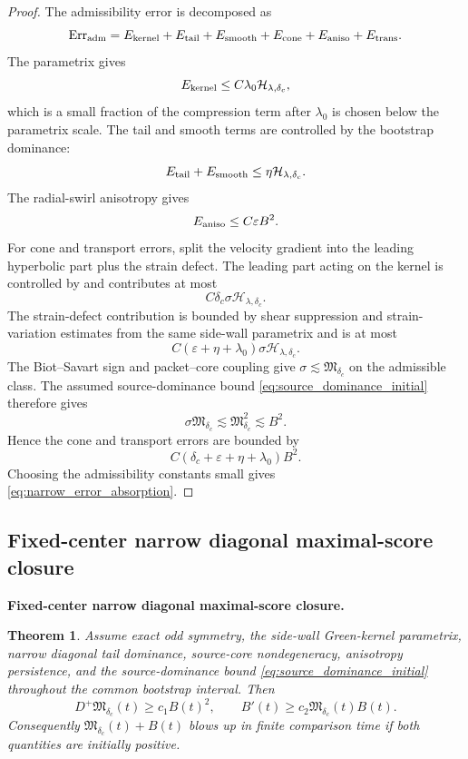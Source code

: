\documentclass[11pt]{amsart}
\newtheorem{theorem}{Theorem}[section]
\begin{document}
\begin{proof}
The admissibility error is decomposed as
\[
\operatorname{Err}_{\rm adm}=E_{\rm kernel}+E_{\rm tail}+E_{\rm smooth}+E_{\rm cone}+E_{\rm aniso}+E_{\rm trans}.
\]
The parametrix gives
\[
E_{\rm kernel}\le C\lambda_0\mathcal H_{\lambda,\delta_c},
\]
which is a small fraction of the compression term after \(\lambda_0\) is chosen below the parametrix scale.  The tail and smooth terms are controlled by the bootstrap dominance:
\[
E_{\rm tail}+E_{\rm smooth}\le\eta\mathcal H_{\lambda,\delta_c}.
\]
The radial-swirl anisotropy gives
\[
E_{\rm aniso}\le C\varepsilon B^2.
\]
For cone and transport errors, split the velocity gradient into the leading hyperbolic part plus the strain defect.  The leading part acting on the kernel is controlled by  and contributes at most
\[
C\delta_c\sigma\mathcal H_{\lambda,\delta_c}.
\]
The strain-defect contribution is bounded by shear suppression and strain-variation estimates from the same side-wall parametrix and is at most
\[
C(\varepsilon+\eta+\lambda_0)\sigma\mathcal H_{\lambda,\delta_c}.
\]
The Biot--Savart sign and packet--core coupling give
\(\sigma\lesssim \mathfrak M_{\delta_c}\) on the admissible class.  The assumed
source-dominance bound \eqref{eq:source_dominance_initial} therefore gives
\[
\sigma\mathfrak M_{\delta_c}\lesssim \mathfrak M_{\delta_c}^2\lesssim B^2.
\]
Hence the cone and transport errors are bounded by
\[
C(\delta_c+\varepsilon+\eta+\lambda_0)B^2.
\]
Choosing the admissibility constants small gives \eqref{eq:narrow_error_absorption}.
\end{proof}

\subsection{Fixed-center narrow diagonal maximal-score closure}

\medskip
\noindent\textbf{Fixed-center narrow diagonal maximal-score closure.}
\begin{theorem}\label{thm:narrow_diag_closure}
Assume exact odd symmetry, the side-wall Green-kernel parametrix, narrow diagonal tail dominance, source-core nondegeneracy, anisotropy persistence, and the source-dominance bound \eqref{eq:source_dominance_initial} throughout the common bootstrap interval.  Then
\begin{equation}\label{eq:narrow_Dini_closure}
D^+\mathfrak M_{\delta_c}(t)
\ge
c_1B(t)^2,
\qquad
B'(t)
\ge
c_2\mathfrak M_{\delta_c}(t)B(t).
\end{equation}
Consequently \(\mathfrak M_{\delta_c}(t)+B(t)\) blows up in finite comparison time if both quantities are initially positive.
\end{theorem}
\end{document}
